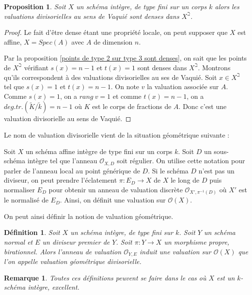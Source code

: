 \documentclass[11pt]{article}
\newtheorem{prop}[thm]{Proposition}
\newtheorem{defi}[thm]{Définition}
\newtheorem{rem}[thm]{Remarque}
\begin{document}
\begin{prop}
Soit $X$ un schéma intègre, de type fini sur un corps $k$ alors les valuations divisorielles au sens de Vaquié sont denses dans $X^\beth$.
\end{prop}

\begin{proof}
Le fait d'être dense étant une propriété locale, on peut supposer que $X$ est affine, $X = Spec(A)$ avec $A$ de dimension $n$. 

Par la proposition \ref{points de type 2 sur type 3 sont denses}, on sait que les points de $X^\beth$ vérifiant $s(x) = n-1$ et $t(x)=1$ sont denses dans $X^\beth$. Montrons qu'ils correspondent à des valuations divisorielles au ses de Vaquié. Soit $x \in X^\beth$ tel que $s(x) = 1$ et $t(x) = n-1$. On note $v$ la valuation associée sur $A$. Comme $s(x) = 1$, on a $rang~v=1$ et comme $t(x) = n-1$, on a $deg.tr.(\tilde{K}/\tilde{k}) = n-1$ où $K$ est le corps de fractions de $A$. Donc c'est une valuation divisorielle au sens de Vaquié.
\end{proof}

Le nom de valuation divisorielle vient de la situation géométrique suivante :

Soit $X$ un schéma affine intègre de type fini sur un corps $k$. Soit $D$ un sous-schéma intègre tel que l'anneau $\mathcal{O}_{X,D}$ soit régulier. On utilise cette notation pour parler de l'anneau local au point générique de $D$. Si le schéma $D$ n'est pas un diviseur, on peut prendre l'éclatement $\pi : E_D \rightarrow X$ de $X$ le long de $D$ puis normaliser $E_D$ pour obtenir un anneau de valuation discrète $\mathcal{O}_{X', \pi^{-1}(D)}$ où $X'$ est le normalisé de $E_D$. Ainsi, on définit une valuation sur $\mathcal{O}(X)$. 

On peut ainsi définir la notion de valuation géométrique.

\begin{defi}
Soit $X$ un schéma intègre, de type fini sur $k$. Soit $Y$ un schéma normal et $E$ un diviseur premier de $Y$. Soit $\pi : Y \rightarrow X$ un morphisme propre, birationnel. Alors l'anneau de valuation $\mathcal{O}_{Y, E}$ induit une valuation sur $\mathcal{O}(X)$ que l'on appelle valuation géométrique divisorielle. 
\end{defi}

\begin{rem}
Toutes ces définitions peuvent se faire dans le cas où $X$ est un $k$-schéma intègre, excellent.
\end{rem}
\end{document}
